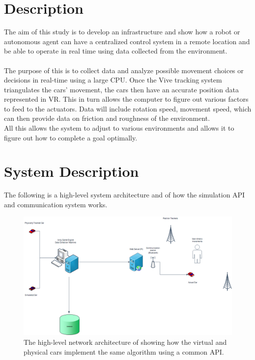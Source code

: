 \documentclass[10pt,a4paper]{article}
\begin{document}
	\section*{Description}
	The aim of this study is to develop an infrastructure and show how a robot or autonomous agent can have a centralized control system in a remote location and be able to operate in real time using data collected from the environment.
	\\\\
	The purpose of this is to collect data and analyze possible movement choices or decisions in real-time using a large CPU. Once the Vive tracking system triangulates the cars' movement, the cars then have an accurate position data represented in VR. This in turn allows the computer to figure out various factors to feed to the actuators. Data will include rotation speed, movement speed, which can then provide data on friction and roughness of the environment.
	\\
	All this allows the system to adjust to various environments and allows it to figure out how to complete a goal optimally.
	\section*{System Description}
	The following is a high-level system architecture and of how the simulation API and communication system works.
	\begin{figure}[h]	\centering
		\includegraphics[width=1\textwidth]{AwesomeDrawing.png}
		\caption{The high-level network architecture of showing how the virtual and physical cars implement the same algorithm using a common API.}
		\label{fig:system-architecture}
	\end{figure}
\end{document}
